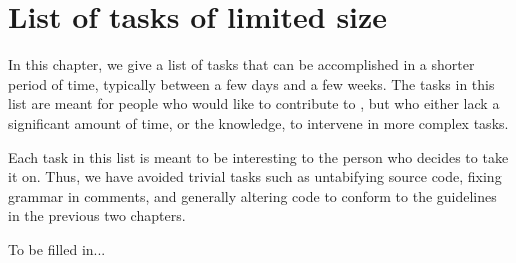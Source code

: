 \chapter{List of tasks of limited size}

In this chapter, we give a list of tasks that can be accomplished in a
shorter period of time, typically between a few days and a few weeks.
The tasks in this list are meant for people who would like to
contribute to \sysname{}, but who either lack a significant amount of
time, or the knowledge, to intervene in more complex tasks.

Each task in this list is meant to be interesting to the person who
decides to take it on.  Thus, we have avoided trivial tasks such as
untabifying source code, fixing grammar in comments, and generally
altering code to conform to the guidelines in the previous two
chapters.

To be filled in...
